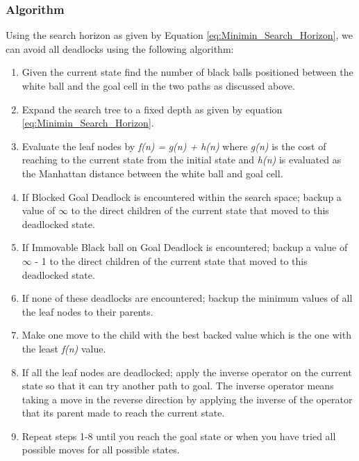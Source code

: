 \documentclass[letterpaper]{article}
\begin{document}
\subsubsection{Algorithm}
Using the search horizon as given by Equation \ref{eq:Minimin_Search_Horizon}, we can avoid all deadlocks using the following algorithm:
\begin{enumerate}\addtocounter{enumi}{0}
\item Given the current state find the number of black balls positioned between the white ball and the goal cell in the two paths as discussed above.
\item Expand the search tree to a fixed depth as given by equation \ref{eq:Minimin_Search_Horizon}.
\item Evaluate the leaf nodes by \emph{f(n)} \emph{=} \emph{g(n) + h(n)} where \emph{g(n)} is the cost of reaching to the current state from the initial state and \emph{h(n)} is evaluated as the Manhattan distance between the white ball and goal cell.
\item If Blocked Goal Deadlock is encountered within the search space; backup a value of $\infty$ to the direct children of the current state that moved to this deadlocked state.
\item If Immovable Black ball on Goal Deadlock is encountered; backup a value of $\infty$ - 1 to the direct children of the current state that moved to this deadlocked state.  
\item If none of these deadlocks are encountered; backup the minimum values of all the leaf nodes to their parents.
\item Make one move to the child with the best backed value which is the one with the least \emph{f(n)} value.
\item If all the leaf nodes are deadlocked; apply the inverse operator on the current state so that it can try another path to goal. The inverse operator means taking a move in the reverse direction by applying the inverse of the operator that its parent made to reach the current state.
\item Repeat steps 1-8 until you reach the goal state or when you have tried all possible moves for all possible states.
\end{enumerate}
\end{document}
